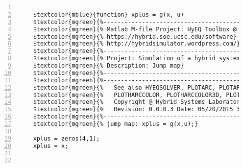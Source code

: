 %  
%  
%  
%  
  
  
\DefineShortVerb[fontfamily=courier,fontseries=m]{\$} 
\DefineShortVerb[fontfamily=courier,fontseries=b]{\#} 
  
\begin{Verbatim}[commandchars=\$\{\},numbers=left,numbersep=2pt] 

    $textcolor{mblue}{function} xplus = g(x, u) 
    $textcolor{mgreen}{%--------------------------------------------------------------------------} 
    $textcolor{mgreen}{% Matlab M-file Project: HyEQ Toolbox @  Hybrid Systems Laboratory (HSL), } 
    $textcolor{mgreen}{% https://hybrid.soe.ucsc.edu/software} 
    $textcolor{mgreen}{% http://hybridsimulator.wordpress.com/} 
    $textcolor{mgreen}{%--------------------------------------------------------------------------} 
    $textcolor{mgreen}{% Project: Simulation of a hybrid system} 
    $textcolor{mgreen}{% Description: Jump map} 
    $textcolor{mgreen}{%--------------------------------------------------------------------------} 
    $textcolor{mgreen}{%--------------------------------------------------------------------------} 
    $textcolor{mgreen}{%   See also HYEQSOLVER, PLOTARC, PLOTARC3, PLOTFLOWS, PLOTHARC,} 
    $textcolor{mgreen}{%   PLOTHARCCOLOR, PLOTHARCCOLOR3D, PLOTHYBRIDARC, PLOTJUMPS.} 
    $textcolor{mgreen}{%   Copyright @ Hybrid Systems Laboratory (HSL),} 
    $textcolor{mgreen}{%   Revision: 0.0.0.3 Date: 05/20/2015 3:42:00} 
    $textcolor{mgreen}{%--------------------------------------------------------------------------} 
    $textcolor{mgreen}{% jump map: xplus = g(x,u);} 
     
    xplus = zeros(4,1); 
    xplus = x; 
     
      
\end{Verbatim}  
  
\UndefineShortVerb{\$} 
\UndefineShortVerb{\#} 
 